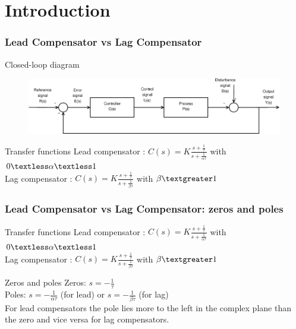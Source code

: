 
\section{Introduction}

\begin{frame}
	\frametitle{Lead Compensator vs Lag Compensator}
	\begin{block}{Closed-loop diagram}
		\begin{figure}
			\centering
			\includegraphics[width=1\linewidth]{Closed-Loop}
		\end{figure}
	\end{block}
	\begin{block}{Transfer functions}
		Lead compensator : 
		$C(s) = K\frac{s + \frac{1}{\tau}}{s + \frac{1}{\alpha\tau}}$ with $0 \textless  \alpha  \textless  1$ \\
		Lag compensator : 
		$C(s) = K\frac{s + \frac{1}{\tau}}{s + \frac{1}{\beta\tau}}$ with $\beta  \textgreater  1$ 
	\end{block}
\end{frame}

\begin{frame}
\frametitle{Lead Compensator vs Lag Compensator: zeros and poles}
\begin{block}{Transfer functions}
	Lead compensator : 
	$C(s) = K\frac{s + \frac{1}{\tau}}{s + \frac{1}{\alpha\tau}}$ with $0 \textless  \alpha  \textless  1$ \\
	Lag compensator : 
	$C(s) = K\frac{s + \frac{1}{\tau}}{s + \frac{1}{\beta\tau}}$ with $\beta  \textgreater  1$
\end{block}
\begin{block}{Zeros and poles}
	Zeros: $s = -\frac{1}{\tau}$ \\
	\vspace{0.1cm}
	Poles: $s = -\frac{1}{\alpha\tau}$ (for lead) or $s = -\frac{1}{\beta\tau}$ (for lag) \\
	\vspace{0.1cm}
	For lead compensators the pole lies more to the left in the complex plane than the zero and vice versa for lag compensators.
\end{block}
\end{frame}

